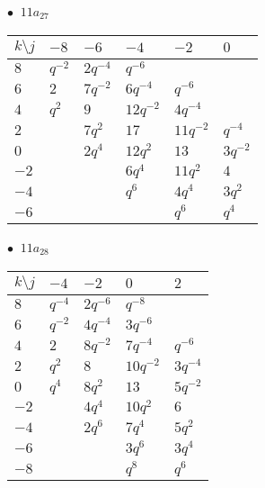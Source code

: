 \begin{minipage}{\linewidth}
$\bullet\ $ $11a_{27}$ \vspace{0.5em} \\
\begin{tabular}{l|lllll}
$k \setminus j$ & $-8$ & $-6$ & $-4$ & $-2$ & $0$ \\
\hline
$8$ & $q^{-2}$ & $2q^{-4}$ & $q^{-6}$ &  &  \\
$6$ & $2$ & $7q^{-2}$ & $6q^{-4}$ & $q^{-6}$ &  \\
$4$ & $q^{2}$ & $9$ & $12q^{-2}$ & $4q^{-4}$ &  \\
$2$ &  & $7q^{2}$ & $17$ & $11q^{-2}$ & $q^{-4}$ \\
$0$ &  & $2q^{4}$ & $12q^{2}$ & $13$ & $3q^{-2}$ \\
$-2$ &  &  & $6q^{4}$ & $11q^{2}$ & $4$ \\
$-4$ &  &  & $q^{6}$ & $4q^{4}$ & $3q^{2}$ \\
$-6$ &  &  &  & $q^{6}$ & $q^{4}$ \\
\end{tabular}
\vspace{2em}
\end{minipage}
%
\begin{minipage}{\linewidth}
$\bullet\ $ $11a_{28}$ \vspace{0.5em} \\
\begin{tabular}{l|llll}
$k \setminus j$ & $-4$ & $-2$ & $0$ & $2$ \\
\hline
$8$ & $q^{-4}$ & $2q^{-6}$ & $q^{-8}$ &  \\
$6$ & $q^{-2}$ & $4q^{-4}$ & $3q^{-6}$ &  \\
$4$ & $2$ & $8q^{-2}$ & $7q^{-4}$ & $q^{-6}$ \\
$2$ & $q^{2}$ & $8$ & $10q^{-2}$ & $3q^{-4}$ \\
$0$ & $q^{4}$ & $8q^{2}$ & $13$ & $5q^{-2}$ \\
$-2$ &  & $4q^{4}$ & $10q^{2}$ & $6$ \\
$-4$ &  & $2q^{6}$ & $7q^{4}$ & $5q^{2}$ \\
$-6$ &  &  & $3q^{6}$ & $3q^{4}$ \\
$-8$ &  &  & $q^{8}$ & $q^{6}$ \\
\end{tabular}
\vspace{2em}
\end{minipage}
%
